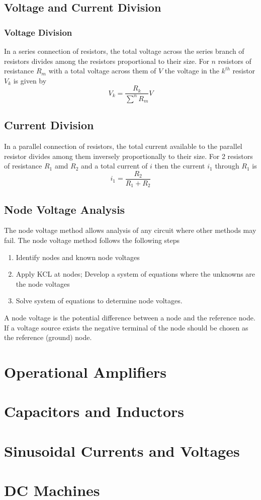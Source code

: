 \documentclass[14pt]{article}
\begin{document}
    \subsection{Voltage and Current Division}
    \subsubsection{Voltage Division}
    In a series connection of resistors, the total voltage across the series branch of resistors divides among the resistors proportional to their size. For $n$ resistors of resistance $R_m$ with a total voltage across them of $V$ the voltage in the $k^{th}$ resistor $V_k$ is given by
    $$V_k=\frac{R_k}{\sum\limits^nR_m}V$$
    \subsection{Current Division}
    In a parallel connection of resistors, the total current available to the parallel resistor divides among them inversely proportionally to their size. For 2 resistors of resistance $R_1$ amd $R_2$ and a total current of $i$ then the current $i_1$ through $R_1$ is
    $$i_1=\frac{R_2}{R_1+R_2}$$
    \subsection{Node Voltage Analysis}
    The node voltage method allows analysis of any circuit where other methods may fail.
    The node voltage method follows the following steps
    \begin{enumerate}
        \item Identify nodes and known node voltages
        \item Apply KCL at nodes; Develop a system of equations where the unknowns are the node voltages
        \item Solve system of equations to determine node voltages.
    \end{enumerate}
    A node voltage is the potential difference between a node and the reference node. If a voltage source exists the negative terminal of the node should be chosen as the reference (ground) node. 
    \section{Operational Amplifiers}
    \section{Capacitors and Inductors}
    \section{Sinusoidal Currents and Voltages}
    \section{DC Machines}  
\end{document}
